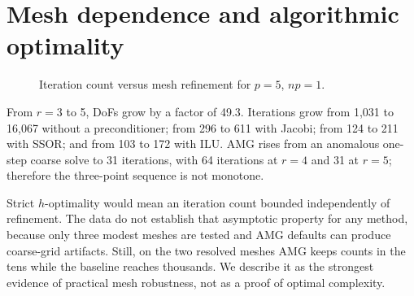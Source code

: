 \documentclass[10pt,a4paper]{article}
\newcommand{\methodstyle}[2]{\addplot+[thick,mark=#1,color=#2]}
\begin{document}
\newpage
\section{Mesh dependence and algorithmic optimality}
\begin{figure}[h]
\centering
{}
\caption{Iteration count versus mesh refinement for $p=5$, $np=1$.}
\label{fig:optimality}
\end{figure}

From $r=3$ to 5, DoFs grow by a factor of 49.3. Iterations grow from 1,031 to 16,067 without a
preconditioner; from 296 to 611 with Jacobi; from 124 to 211 with SSOR; and from 103 to 172 with
ILU. AMG rises from an anomalous one-step coarse solve to 31 iterations, with 64 iterations at
$r=4$ and 31 at $r=5$; therefore the three-point sequence is not monotone.

Strict $h$-optimality would mean an iteration count bounded independently of refinement. The data
do not establish that asymptotic property for any method, because only three modest meshes are
tested and AMG defaults can produce coarse-grid artifacts. Still, on the two resolved meshes AMG
keeps counts in the tens while the baseline reaches thousands. We describe it as the strongest
evidence of practical mesh robustness, not as a proof of optimal complexity.

\newpage
\end{document}
